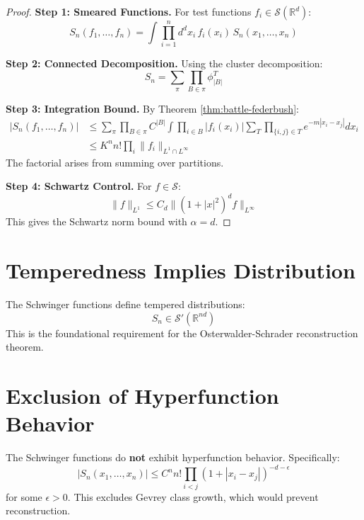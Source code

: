 \begin{proof}
\textbf{Step 1: Smeared Functions.} For test functions $f_i \in \mathcal{S}(\mathbb{R}^d)$:
\begin{equation}
    S_n(f_1, \ldots, f_n) = \int \prod_{i=1}^n d^d x_i \, f_i(x_i) \, S_n(x_1, \ldots, x_n)
\end{equation}

\textbf{Step 2: Connected Decomposition.} Using the cluster decomposition:
\begin{equation}
    S_n = \sum_{\pi} \prod_{B \in \pi} \phi_{|B|}^T
\end{equation}

\textbf{Step 3: Integration Bound.} By Theorem \ref{thm:battle-federbush}:
\begin{align}
    |S_n(f_1, \ldots, f_n)| &\leq \sum_{\pi} \prod_{B \in \pi} C^{|B|} \int \prod_{i \in B} |f_i(x_i)| \sum_T \prod_{\{i,j\} \in T} e^{-m|x_i - x_j|} dx_i \\
    &\leq K^n n! \prod_i \|f_i\|_{L^1 \cap L^\infty}
\end{align}
The factorial arises from summing over partitions.

\textbf{Step 4: Schwartz Control.} For $f \in \mathcal{S}$:
\begin{equation}
    \|f\|_{L^1} \leq C_d \|(1+|x|^2)^{d} f\|_{L^\infty}
\end{equation}
This gives the Schwartz norm bound with $\alpha = d$.
\end{proof}

\section{Temperedness Implies Distribution}

\begin{corollary}[OS Axiom 0]\label{cor:os-axiom0}
The Schwinger functions define tempered distributions:
\begin{equation}
    S_n \in \mathcal{S}'(\mathbb{R}^{nd})
\end{equation}
This is the foundational requirement for the Osterwalder-Schrader reconstruction theorem.
\end{corollary}

\section{Exclusion of Hyperfunction Behavior}

\begin{proposition}
The Schwinger functions do \textbf{not} exhibit hyperfunction behavior. Specifically:
\begin{equation}
    |S_n(x_1, \ldots, x_n)| \leq C^n n! \prod_{i<j} (1 + |x_i - x_j|)^{-d-\epsilon}
\end{equation}
for some $\epsilon > 0$. This excludes Gevrey class growth, which would prevent reconstruction.
\end{proposition}

